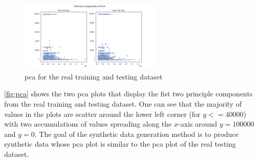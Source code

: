 \begin{figure}[h]
	\centering
	\includegraphics[width=0.6\textwidth]{images/pca/pca.png}
	\caption{\gls{pca} for the real training and testing dataset}
	\label{fig:pca}
\end{figure}

\autoref{fig:pca} shows the two \gls{pca} plots that display the fist two principle components from the real training and testing dataset.
One can see that the majority of values in the plots are scatter around the lower left corner (for $y<=40000$) with two accumulations of values spreading along the $x$-axis around $y=100000$ and $y=0$.
The goal of the synthetic data generation method is to produce synthetic data whose \gls{pca} plot is similar to the \gls{pca} plot of the real testing dataset.

